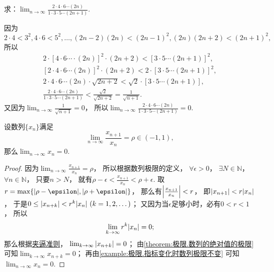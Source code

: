 \begin{example}
求：\(\lim_{n\to\infty} \frac{2 \cdot 4 \cdot 6 \dotsm (2n)}{1 \cdot 3 \cdot 5 \dotsm (2n+1)}\).
\begin{solution}
因为\[
	2 \cdot 4 < 3^2,
	4 \cdot 6 < 5^2,
	\dotsc,
	(2n-2)(2n) < (2n-1)^2,
	(2n)(2n+2) < (2n+1)^2,
\]
所以\begin{gather*}
	2 \cdot [4 \cdot 6 \dotsm \cdot (2n)]^2 \cdot (2n+2)
	< [3 \cdot 5 \dotsm (2n+1)]^2, \\
	[2 \cdot 4 \cdot 6 \dotsm (2n)]^2 \cdot (2n+2)
	< 2 \cdot [3 \cdot 5 \dotsm (2n+1)]^2, \\
	2 \cdot 4 \cdot 6 \dotsm (2n) \cdot \sqrt{2n+2}
	< \sqrt2 \cdot [3 \cdot 5 \dotsm (2n+1)], \\
	\frac{2 \cdot 4 \cdot 6 \dotsm (2n)}{1 \cdot 3 \cdot 5 \dotsm (2n+1)}
	< \frac{\sqrt2}{\sqrt{2n+2}}
	= \frac1{\sqrt{n+1}}.
\end{gather*}
又因为\(\lim_{n\to\infty} \frac1{\sqrt{n+1}} = 0\)，
所以\(\lim_{n\to\infty} \frac{2 \cdot 4 \cdot 6 \dotsm (2n)}{1 \cdot 3 \cdot 5 \dotsm (2n+1)} = 0\).
\end{solution}
\end{example}

\begin{proposition}
设数列\(\{x_n\}\)满足\[
	\lim_{n\to\infty} \frac{x_{n+1}}{x_n} = \rho \in (-1,1),
\]
那么\(\lim_{n\to\infty} x_n = 0\).
\begin{proof}
因为\(\lim_{n\to\infty} \frac{x_{n+1}}{x_n} = \rho\)，
所以根据数列极限的定义，
\(\forall\epsilon>0\)，
\(\exists N\in\mathbb{N}\)，
\(\forall n\in\mathbb{N}\)，
只要\(n > N\)，
就有\(\rho-\epsilon < \frac{x_{n+1}}{x_n} < \rho+\epsilon\).
取\(r=\max\{\abs{\rho-\epsilon},\abs{\rho+\epsilon}\}\)，
那么有\(\abs{\frac{x_{n+1}}{x_n}} < r\)，
即\(\abs{x_{n+1}} < r \abs{x_n}\)，
于是\(0 \leq \abs{x_{n+k}} < r^k \abs{x_n}\ (k=1,2,\dotsc)\)；
又因为当\(\epsilon\)足够小时，必有\(0<r<1\)，
所以\[
	\lim_{k\to\infty} r^k \abs{x_n} = 0;
\]
那么根据\hyperref[theorem:数列极限.夹逼准则]{夹逼准则}，
\(\lim_{k\to\infty} \abs{x_{n+k}} = 0\)；
由\cref{theorem:极限.数列的绝对值的极限} 可知\(\lim_{k\to\infty} x_{n+k} = 0\)；
再由\cref{example:极限.指标变化时数列极限不变} 可知\(\lim_{n\to\infty} x_n = 0\).
\end{proof}
\end{proposition}
